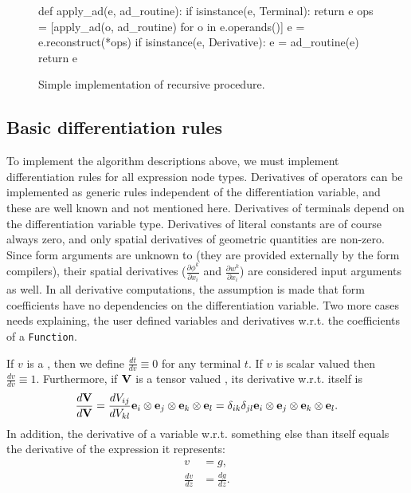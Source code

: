 
\begin{figure}[ht]
\begin{code}
def apply_ad(e, ad_routine):
    if isinstance(e, Terminal):
        return e
    ops = [apply_ad(o, ad_routine) for o in e.operands()]
    e = e.reconstruct(*ops)
    if isinstance(e, Derivative):
        e = ad_routine(e)
    return e
\end{code}
\caption{Simple implementation of recursive  procedure.}
\label{ufl:fig:applyad}
\end{figure}

\subsection{Basic differentiation rules}

To implement the algorithm descriptions above, we must implement
differentiation rules for all expression node types. Derivatives of
operators can be implemented as generic rules independent of the
differentiation variable, and these are well known and not mentioned
here. Derivatives of terminals depend on the differentiation variable
type.  Derivatives of literal constants are of course always zero, and
only spatial derivatives of geometric quantities are non-zero.  Since
form arguments are unknown to \ufl{} (they are provided externally by
the form compilers), their spatial derivatives ($\frac{\partial
  \phi^k}{\partial x_i}$ and $\frac{\partial w^k}{\partial x_i}$) are
considered input arguments as well.  In all derivative computations,
the assumption is made that form coefficients have no dependencies on
the differentiation variable.  Two more cases needs explaining, the
user defined variables and derivatives w.r.t. the coefficients of a
\texttt{Function}.

If $v$ is a , then we define $\frac{d t}{d v} \equiv
0$ for any terminal $t$. If $v$ is scalar valued then $\frac{d v}{d v}
\equiv 1$. Furthermore, if $\mathbf{V}$ is a tensor valued ,
its derivative w.r.t. itself is
\begin{align}
\frac{d \mathbf{V}}{d \mathbf{V}}
    =
    \frac{d V_{ij}}{d V_{kl}}
    \mathbf{e}_i\otimes\mathbf{e}_j\otimes\mathbf{e}_k\otimes\mathbf{e}_l
    =
    \delta_{ik}\delta_{jl}
    \mathbf{e}_i\otimes\mathbf{e}_j\otimes\mathbf{e}_k\otimes\mathbf{e}_l .
\end{align}
In addition, the derivative of a variable w.r.t. something else than
itself equals the derivative of the expression it represents:
\begin{align}
v &= g, \\
\frac{d v}{d z} &= \frac{d g}{d z}.
\end{align}

